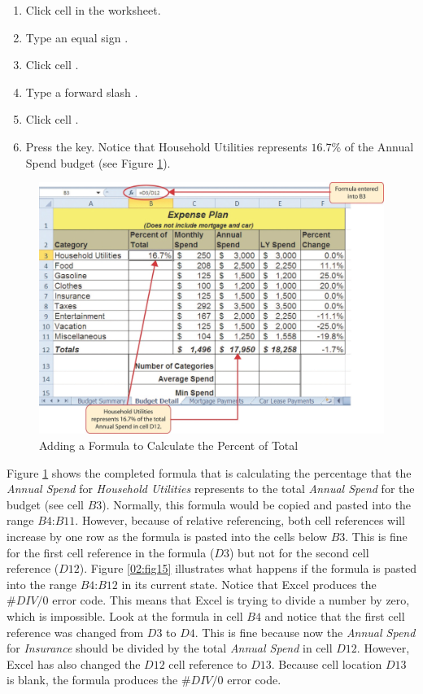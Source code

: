 \begin{enumerate}
	\item Click cell  in the  worksheet.
	\item Type an equal sign \fmtTyping{=}.
	\item Click cell .
	\item Type a forward slash \fmtTyping{/}.
	\item Click cell .
	\item Press the  key. Notice that Household Utilities represents $ 16.7$\% of the Annual Spend budget (see Figure \ref{02:fig14}).
\end{enumerate}

\begin{figure}[H]
	\centering
	\includegraphics[width=\maxwidth{.95\linewidth}]{gfx/ch02_fig14}
	\caption{Adding a Formula to Calculate the Percent of Total}
	\label{02:fig14}
\end{figure}

Figure \ref{02:fig14} shows the completed formula that is calculating the percentage that the \textit{Annual Spend} for \textit{Household Utilities}  represents to the total \textit{Annual Spend} for the budget (see cell \textit{$ B3 $}). Normally, this formula would be copied and pasted into the range $ B4 $:$ B11 $. However, because of relative referencing, both cell references will increase by one row as the formula is pasted into the cells below $ B3 $. This is fine for the first cell reference in the formula ($ D3 $) but not for the second cell reference ($ D12 $). Figure \ref{02:fig15} illustrates what happens if the formula is pasted into the range $ B4 $:$ B12 $ in its current state. Notice that Excel produces the $ \#DIV/0 $ error code. This means that Excel is trying to divide a number by zero, which is impossible. Look at the formula in cell $ B4 $ and notice that the first cell reference was changed from $ D3 $ to $ D4 $. This is fine because now the \textit{Annual Spend} for \textit{Insurance} should be divided by the total \textit{Annual Spend} in cell $ D12 $. However, Excel has also changed the $ D12 $ cell reference to $ D13 $. Because cell location $ D13 $ is blank, the formula produces the $ \#DIV/0 $ error code.

